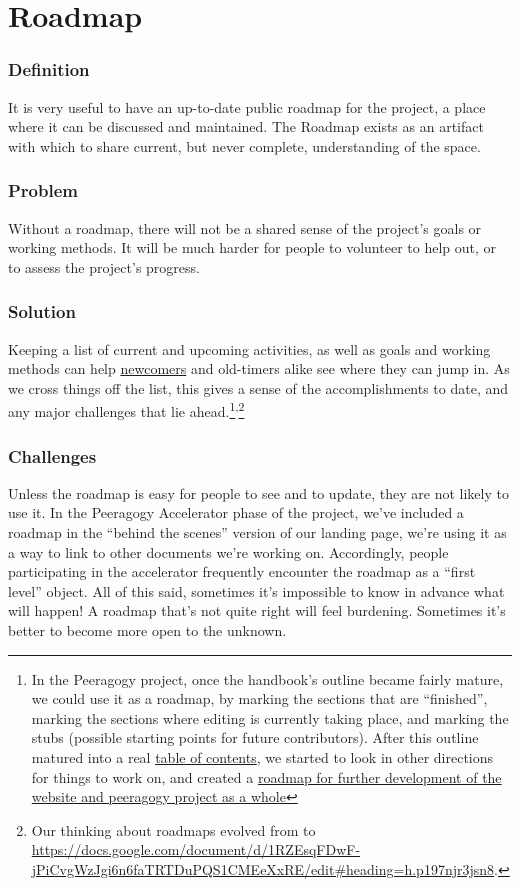 \section{Roadmap} \label{sec:Roadmap}

\subsubsection*{Definition} It is very useful to have an up-to-date public
roadmap for the project, a place where it can be discussed and
maintained. The Roadmap exists as an artifact with which to share
current, but never complete, understanding of the space.

\subsubsection*{Problem} Without a roadmap, there will not be a shared sense of
the project's goals or working methods. It will be much harder for
people to volunteer to help out, or to assess the project's progress.

\subsubsection*{Solution} Keeping a list of current and upcoming activities, as
well as goals and working methods can
help \href{http://peeragogy.org/practice/heuristics/newcomer/}{newcomers}
and old-timers alike see where they can jump in. As we cross things off
the list, this gives a sense of the accomplishments to date, and any
major challenges that lie ahead.\footnote{In the Peeragogy project, once the handbook's outline became fairly
  mature, we could use it as a roadmap, by marking the sections that are
  ``finished'', marking the sections where editing is currently taking
  place, and marking the stubs (possible starting points for future
  contributors). After this outline matured into a
  real \href{http://peeragogy.org/table-of-contents/}{table of contents},
  we started to look in other directions for things to work on, and
  created a \href{http://peeragogy.org/peeragogy-org-roadmap/}{roadmap
  for further development of the website and peeragogy project as a
  whole}}\textsuperscript{,}\footnote{Our thinking about roadmaps evolved from \cite{corneli2013roadmaps} to \url{https://docs.google.com/document/d/1RZEsqFDwF-jPiCvgWzJgi6n6faTRTDuPQS1CMEeXxRE/edit\#heading=h.p197njr3jsn8}.}

\subsubsection*{Challenges} Unless the roadmap is easy for people to see and to
update, they are not likely to use it. In the Peeragogy Accelerator
phase of the project, we've included a roadmap in the ``behind the
scenes'' version of our landing page, we're using it as a way to link to
other documents we're working on. Accordingly, people participating in
the accelerator frequently encounter the roadmap as a ``first level''
object. All of this said, sometimes it's impossible to know in advance
what will happen! A roadmap that's not quite right will feel burdening.
Sometimes it's better to become more open to the unknown.

